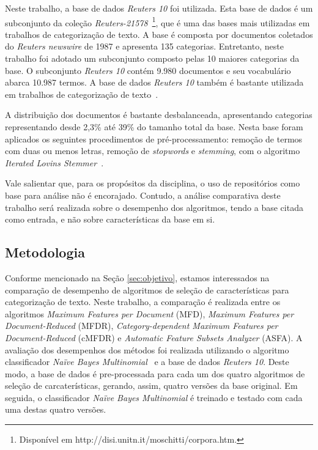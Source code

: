\documentclass[conference]{IEEEtran}
\begin{document}
Neste trabalho, a base de dados \textit{Reuters 10} foi utilizada.
Esta base de dados é um subconjunto da coleção \textit{Reuters-21578}~\footnote{Disponível em http://disi.unitn.it/moschitti/corpora.htm.}, que é uma das bases mais utilizadas em trabalhos de categorização de texto.
A base é composta por documentos coletados do \textit{Reuters newswire} de 1987 e apresenta 135 categorias.
Entretanto, neste trabalho foi adotado um subconjunto composto pelas 10 maiores categorias da base.
O subconjunto \textit{Reuters 10} contém 9.980 documentos e seu vocabulário abarca 10.987 termos.
A base de dados \textit{Reuters 10} também é bastante utilizada em trabalhos de categorização de texto~\cite{chang2008multilabel,chen2009feature,yang2011new}. 

A distribuição dos documentos é bastante desbalanceada, apresentando categorias representando desde 2,3\% até 39\% do tamanho total da base. 
Nesta base foram aplicados os seguintes procedimentos de pré-processamento:
remoção de termos com duas ou menos letras, remoção de \textit{stopwords} e \textit{stemming}, com o algoritmo \textit{Iterated Lovins
Stemmer}~\cite{lovins1968development}.

Vale salientar que, para os propósitos da disciplina, o uso de repositórios como base para análise não é encorajado. Contudo, a análise comparativa deste trabalho será realizada sobre o desempenho dos algoritmos, tendo a base citada como entrada, e não sobre características da base em si.

\subsection{Metodologia}
\label{sec:metodologia}

Conforme mencionado na Seção \ref{sec:objetivo}, estamos interessados na comparação de desempenho de algoritmos de seleção de características para categorização de texto.
Neste trabalho, a comparação é realizada entre os algoritmos \textit{Maximum Features per Document} (MFD), \textit{Maximum Features per Document-Reduced} (MFDR), \textit{Category-dependent Maximum Features per Document-Reduced} (cMFDR) e \textit{Automatic Feature Subsets Analyzer} (ASFA). A avaliação dos desempenhos dos métodos foi realizada utilizando o algoritmo classificador \textit{Na\"ive Bayes Multinomial}~\cite{mccallum1998comparison} e a base de dados \textit{Reuters 10}. Deste modo, a base de dados é pre-processada para cada um dos quatro algoritmos de seleção de carcaterísticas, gerando, assim, quatro versões da base original. Em seguida, o classificador \textit{Na\"ive Bayes Multinomial} é  treinado e testado com cada uma destas quatro versões.
\end{document}
